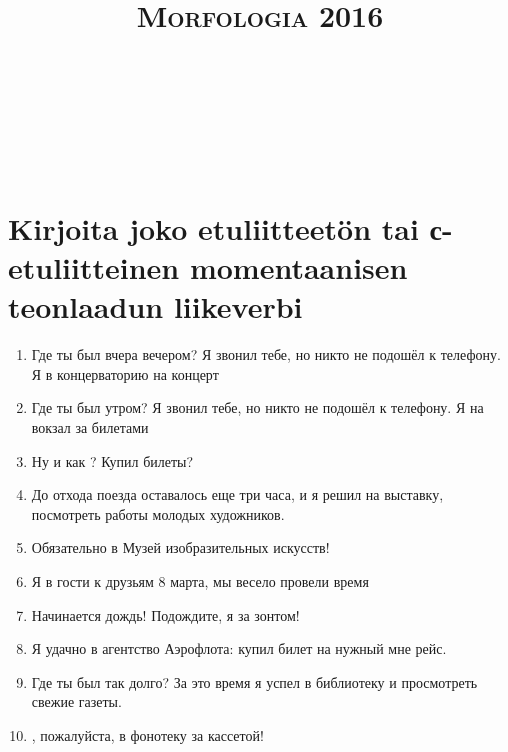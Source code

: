 \documentclass[paper=a4, fontsize=11pt]{scrartcl}
\title{	
\normalfont \normalsize 
\textsc{Morfologia 2016} \\ [25pt] %
\horrule{0.5pt} \\[0.4cm] %
\huge  \\ %
\horrule{2pt} \\[0.5cm] %
}
\date{} %
\begin{document}
\section{Kirjoita joko etuliitteetön tai с-etuliitteinen momentaanisen teonlaadun liikeverbi}

\begin{enumerate}
    \item Где ты был вчера вечером? Я звонил тебе, но никто не подошёл к
        телефону. Я \raisebox{-0.1cm}{\shortstack{\underline{\hspace{3cm}}}} в
        концерваторию на концерт
    \item Где ты был утром? Я звонил тебе, но никто не подошёл к телефону.
        Я \raisebox{-0.1cm}{\shortstack{\underline{\hspace{3cm}}}} на вокзал
        за билетами
    \item Ну и как \raisebox{-0.1cm}{\shortstack{\underline{\hspace{3cm}}}}?
        Купил билеты?
    \item До отхода поезда оставалось еще три часа, и я решил
        \raisebox{-0.1cm}{\shortstack{\underline{\hspace{3cm}}}} на выставку,
        посмотреть работы молодых художников.
    \item Обязательно \raisebox{-0.1cm}{\shortstack{\underline{\hspace{3cm}}}}
        в Музей изобразительных искусств!
    \item Я \raisebox{-0.1cm}{\shortstack{\underline{\hspace{3cm}}}} в гости к
        друзьям 8 марта, мы весело провели время
    \item Начинается дождь! Подождите, я
        \raisebox{-0.1cm}{\shortstack{\underline{\hspace{3cm}}}} за зонтом!
    \item Я удачно \raisebox{-0.1cm}{\shortstack{\underline{\hspace{3cm}}}} в
        агентство Аэрофлота: купил билет на нужный мне рейс.
    \item Где ты был так долго? За это время я успел
        \raisebox{-0.1cm}{\shortstack{\underline{\hspace{3cm}}}} в библиотеку
        и просмотреть свежие газеты.
    \item \raisebox{-0.1cm}{\shortstack{\underline{\hspace{3cm}}}},
        пожалуйста, в фонотеку за кассетой!

\end{enumerate}
\end{document}

